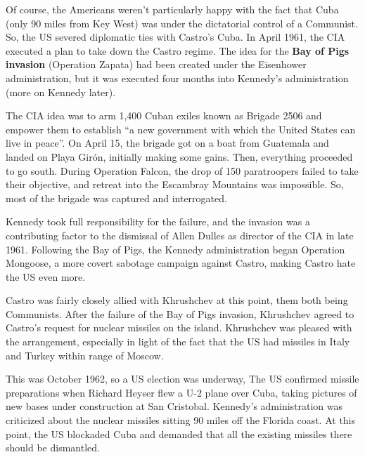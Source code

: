 Of course, the Americans weren't particularly happy with the fact that Cuba (only 90 miles from Key West)
was under the dictatorial control of a Communist.
So, the US severed diplomatic ties with Castro's Cuba.
In April 1961, the CIA executed a plan to take down the Castro regime.
The idea for the \textbf{Bay of Pigs invasion} (Operation Zapata)
had been created under the Eisenhower administration,
but it was executed four months into Kennedy's administration (more on Kennedy later).

The CIA idea was to arm 1,400 Cuban exiles known as Brigade 2506
and empower them to establish ``a new government with which the United States can live in peace''.
On April 15, the brigade got on a boat from Guatemala and landed on Playa Gir\'on, initially making some gains.
Then, everything proceeded to go south.
During Operation Falcon, the drop of 150 paratroopers failed to take their objective,
and retreat into the Escambray Mountains was impossible.
So, most of the brigade was captured and interrogated.

Kennedy took full responsibility for the failure,
and the invasion was a contributing factor to the dismissal of Allen Dulles as director of the CIA in late 1961.
Following the Bay of Pigs, the Kennedy administration began Operation Mongoose,
a more covert sabotage campaign against Castro, making Castro hate the US even more.

Castro was fairly closely allied with Khrushchev at this point, them both being Communists.
After the failure of the Bay of Pigs invasion,
Khrushchev agreed to Castro's request for nuclear missiles on the island.
Khrushchev was pleased with the arrangement,
especially in light of the fact that the US had missiles in Italy and Turkey within range of Moscow.

This was October 1962, so a US election was underway,
The US confirmed missile preparations when Richard Heyser flew a U-2 plane over Cuba,
taking pictures of new bases under construction at San Cristobal.
Kennedy's administration was criticized about the nuclear missiles sitting 90 miles off the Florida coast.
At this point, the US blockaded Cuba and demanded that all the existing missiles there should be dismantled.

